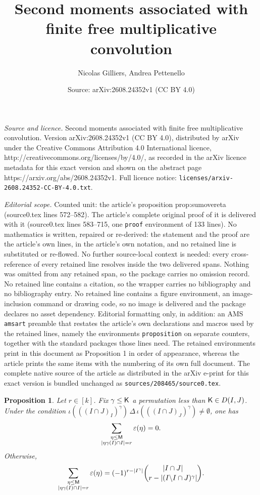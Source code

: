 \documentclass[10pt,a4paper]{amsart}
\title{Second moments associated with finite free multiplicative convolution}
\author{Nicolas Gilliers, Andrea Pettenello}
\date{Source: arXiv:2608.24352v1 (CC BY 4.0)}
\newtheorem{proposition}{Proposition}
\begin{document}
\maketitle

\noindent\emph{Source and licence.} Second moments associated with finite free multiplicative convolution. Version arXiv:2608.24352v1 (CC BY 4.0), distributed by arXiv under the Creative Commons Attribution 4.0 International licence, http://creativecommons.org/licenses/by/4.0/, as recorded in the arXiv licence metadata for this exact version and shown on the abstract page https://arxiv.org/abs/2608.24352v1. Full licence notice: \texttt{licenses/arxiv-2608.24352-CC-BY-4.0.txt}.\par\smallskip

\noindent\textit{Editorial scope.} Counted unit: the article's proposition prop:sumovereta (source0.tex lines 572--582). The article's complete original proof of it is delivered with it (source0.tex lines 583--715, one \texttt{proof} environment of 133 lines). No mathematics is written, repaired or re-derived: the statement and the proof are the article's own lines, in the article's own notation, and no retained line is substituted or re-flowed.  No further source-local context is needed: every cross-reference of every retained line resolves inside the two delivered spans.  Nothing was omitted from any retained span, so the package carries no omission record.  No retained line contains a citation, so the wrapper carries no bibliography and no bibliography entry.  No retained line contains a figure environment, an image-inclusion command or drawing code, so no image is delivered and the package declares no asset dependency.  Editorial formatting only, in addition: an AMS \texttt{amsart} preamble that restates the article's own declarations and macros used by the retained lines, namely the environments \texttt{proposition} on separate counters, together with the standard packages those lines need.  The retained environments print in this document as Proposition 1 in order of appearance, whereas the article prints the same items with the numbering of its own full document.  The complete native source of the article as distributed in the arXiv e-print for this exact version is bundled unchanged as \texttt{sources/208465/source0.tex}.
\begin{proposition}\label{prop:sumovereta}
		Let $r\in [k]$. Fix $\gamma \leq {\sf K}$ a permutation less than ${\sf K} \in D(I,J)$. Under the condition $\iota(((I\cap J)_I)^{\gamma}) \,\Delta \,\iota(((I\cap J)_J)^{\gamma}) \neq \emptyset$, one has
	$$
		\sum_{\substack{\eta \leq {\sf M}\\ |\eta\gamma(I)\cap I|=r}}\varepsilon(\eta)=0.
	$$
	Otherwise, 
	\begin{align*}
		\sum_{\substack{\eta \leq {\sf M} \\ |\eta\gamma(I)\cap I|=r}}\varepsilon(\eta)=
		(-1)^{r-|I^\gamma|} \binom{|I\cap J|}{r-|(I\backslash I \cap J)^{\gamma}|}.
	\end{align*}
\end{proposition}
\end{document}
